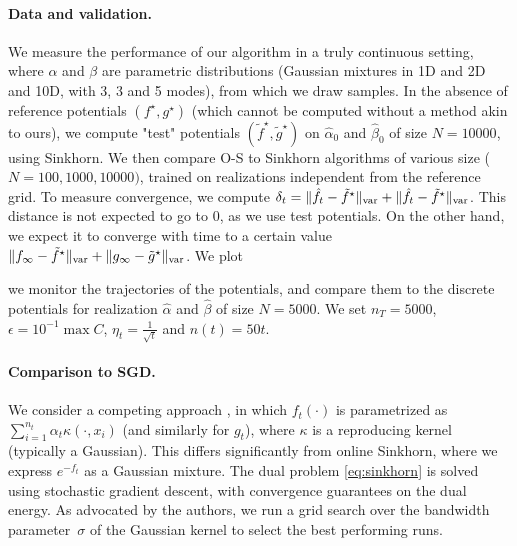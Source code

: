 \paragraph{Data and validation.}We measure the performance of our algorithm in a
truly continuous setting, where $\alpha$ and $\beta$ are  parametric
distributions (Gaussian mixtures in 1D and 2D and 10D, with 3, 3 and 5 modes),
from which we draw samples. In the absence of reference potentials $(f^\star,
g^\star)$ (which cannot be computed without a method akin to ours), we compute
"test" potentials $(\tilde f^\star, \tilde g^\star)$ on $\hat \alpha_0$ and
$\hat \beta_0$ of size $N=10000$, using Sinkhorn. We then compare O-S to
Sinkhorn algorithms of various size ($N=100,1000, 10000)$, trained on
realizations independent from the reference grid. To measure convergence, we
compute $\delta_t = \Vert \hat f_t - \tilde f^\star \Vert_{\text{\upshape var}} + \Vert \hat f_t - \tilde
f^\star \Vert_{\text{\upshape var}}$. This distance is not expected to go to $0$, as we use
test potentials. On the other hand, we expect it to converge with time to a
certain value $\Vert f_\infty - \tilde f^\star \Vert_{\text{\upshape var}} + \Vert g_\infty -
\tilde g^\star \Vert_{\text{\upshape var}}$. We plot



we monitor the
trajectories of the potentials, and compare them to the discrete potentials for
realization $\hat \alpha$ and $\hat \beta$ of size $N=5000$. We set $n_T = 5000$,
$\epsilon = 10^{-1} \max C$, $\eta_t = \frac{1}{\sqrt{t}}$ and $n(t) = 50 t$.

\paragraph{Comparison to SGD.}\label{sec:compare}
%
We consider a competing approach \citep{2016-genevay-nips}, in which $f_t(\cdot)$
is parametrized as $\sum_{i=1}^{n_t} \alpha_t \kappa(\cdot, x_i)$ (and similarly for
$g_t$), where $\kappa$ is a reproducing kernel (typically a Gaussian). This
differs significantly from online Sinkhorn, where we express $e^{-f_t}$ as a
Gaussian mixture. The dual problem \eqref{eq:sinkhorn} is solved using
stochastic gradient descent, with convergence guarantees on the dual energy.  As
advocated by the authors, we run a grid search over the bandwidth
parameter~$\sigma$ of the Gaussian kernel to select the best performing runs. 

